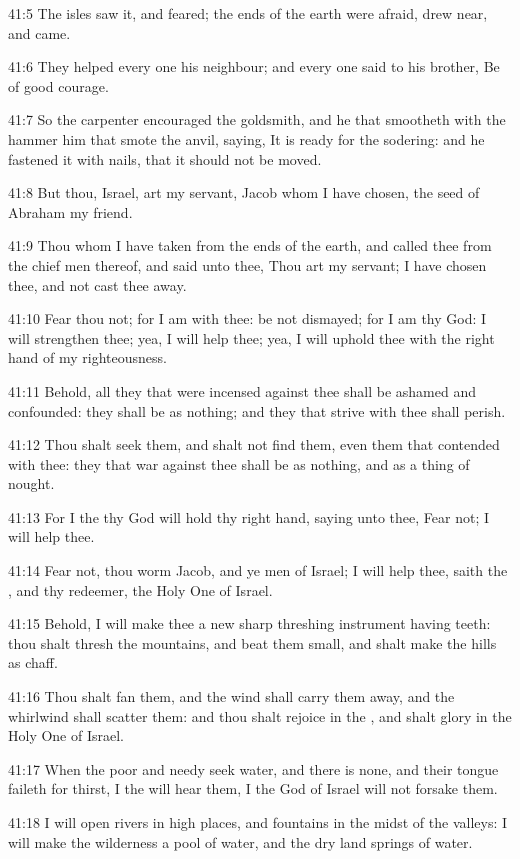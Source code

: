 41:5 The isles saw it, and feared; the ends of the earth were afraid, drew near, and came.

41:6 They helped every one his neighbour; and every one said to his brother, Be of good courage.

41:7 So the carpenter encouraged the goldsmith, and he that smootheth with the hammer him that smote the anvil, saying, It is ready for the sodering: and he fastened it with nails, that it should not be moved.

41:8 But thou, Israel, art my servant, Jacob whom I have chosen, the seed of Abraham my friend.

41:9 Thou whom I have taken from the ends of the earth, and called thee from the chief men thereof, and said unto thee, Thou art my servant; I have chosen thee, and not cast thee away.

41:10 Fear thou not; for I am with thee: be not dismayed; for I am thy God: I will strengthen thee; yea, I will help thee; yea, I will uphold thee with the right hand of my righteousness.

41:11 Behold, all they that were incensed against thee shall be ashamed and confounded: they shall be as nothing; and they that strive with thee shall perish.

41:12 Thou shalt seek them, and shalt not find them, even them that contended with thee: they that war against thee shall be as nothing, and as a thing of nought.

41:13 For I the \LORD thy God will hold thy right hand, saying unto thee, Fear not; I will help thee.

41:14 Fear not, thou worm Jacob, and ye men of Israel; I will help thee, saith the \LORD, and thy redeemer, the Holy One of Israel.

41:15 Behold, I will make thee a new sharp threshing instrument having teeth: thou shalt thresh the mountains, and beat them small, and shalt make the hills as chaff.

41:16 Thou shalt fan them, and the wind shall carry them away, and the whirlwind shall scatter them: and thou shalt rejoice in the \LORD, and shalt glory in the Holy One of Israel.

41:17 When the poor and needy seek water, and there is none, and their tongue faileth for thirst, I the \LORD will hear them, I the God of Israel will not forsake them.

41:18 I will open rivers in high places, and fountains in the midst of the valleys: I will make the wilderness a pool of water, and the dry land springs of water.

